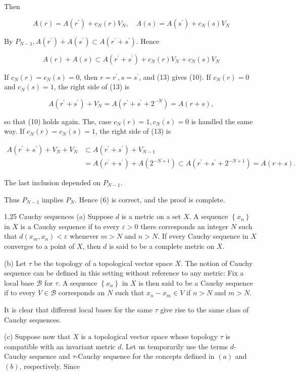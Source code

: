 \documentclass[10pt]{article}
\begin{document}
Then

$$
A(r)=A\left(r^{\prime}\right)+c_{N}(r) V_{N}, \quad A(s)=A\left(s^{\prime}\right)+c_{N}(s) V_{N}
$$

By $P_{N-1}, A\left(r^{\prime}\right)+A\left(s^{\prime}\right) \subset A\left(r^{\prime}+s^{\prime}\right)$. Hence

$$
A(r)+A(s) \subset A\left(r^{\prime}+s^{\prime}\right)+c_{N}(r) V_{N}+c_{N}(s) V_{N}
$$

If $c_{N}(r)=c_{N}(s)=0$, then $r=r^{\prime}, s=s^{\prime}$, and (13) gives (10). If $c_{N}(r)=0$ and $c_{N}(s)=1$, the right side of (13) is

$$
A\left(r^{\prime}+s^{\prime}\right)+V_{N}=A\left(r^{\prime}+s^{\prime}+2^{-N}\right)=A(r+s),
$$

so that (10) holds again. The, case $c_{N}(r)=1, c_{N}(s)=0$ is handled the same way. If $c_{N}(r)=c_{N}(s)=1$, the right side of (13) is

$$
\begin{aligned}
A\left(r^{\prime}+s^{\prime}\right)+V_{N}+V_{N} & \subset A\left(r^{\prime}+s^{\prime}\right)+V_{N-1} \\
& =A\left(r^{\prime}+s^{\prime}\right)+A\left(2^{-N+1}\right) \subset A\left(r^{\prime}+s^{\prime}+2^{-N+1}\right)=A(r+s) .
\end{aligned}
$$

The last inclusion depended on $P_{N-1}$.

Thus $P_{N-1}$ implies $P_{N}$. Hence (6) is correct, and the proof is complete.

1.25 Cauchy sequences (a) Suppose $d$ is a metric on a set $X$. A sequence $\left\{x_{n}\right\}$ in $X$ is a Cauchy sequence if to every $\varepsilon>0$ there corresponds an integer $N$ such that $d\left(x_{m}, x_{n}\right)<\varepsilon$ whenever $m>N$ and $n>N$. If every Cauchy sequence in $X$ converges to a point of $X$, then $d$ is said to be a complete metric on $X$.

(b) Let $\tau$ be the topology of a topological vector space $X$. The notion of Cauchy sequence can be defined in this setting without reference to any metric: Fix a local base $\mathscr{B}$ for $\tau$. A sequence $\left\{x_{n}\right\}$ in $X$ is then said to be a Cauchy sequence if to every $V \in \mathscr{B}$ corresponds an $N$ such that $x_{n}-x_{m} \in V$ if $n>N$ and $m>N$.

It is clear that different local bases for the same $\tau$ give rise to the same class of Cauchy sequences.

(c) Suppose now that $X$ is a topological vector space whose topology $\tau$ is compatible with an invariant metric $d$. Let us temporarily use the terms $d$-Cauchy sequence and $\tau$-Cauchy sequence for the concepts defined in $(a)$ and $(b)$, respectively. Since
\end{document}
